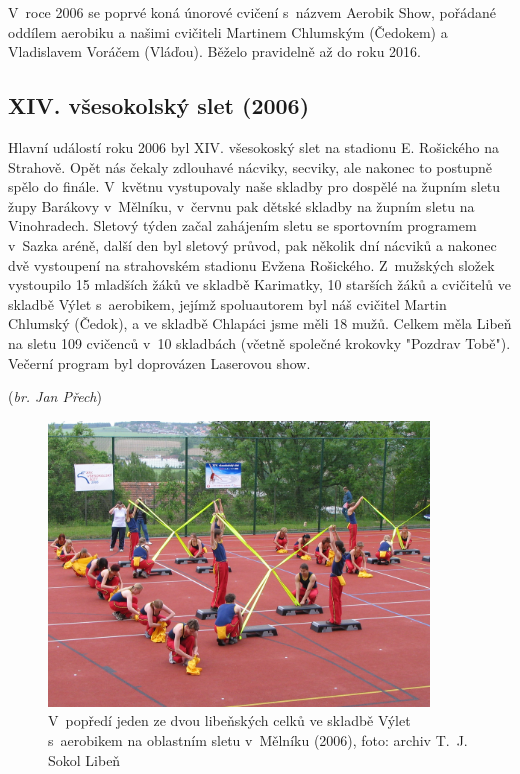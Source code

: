 \documentclass[a5paper, 11pt, twoside]{article}
\begin{document}
V~roce 2006 se poprvé koná únorové cvičení s~názvem Aerobik Show,
pořádané oddílem aerobiku a našimi cvičiteli Martinem Chlumským
(Čedokem) a Vladislavem Voráčem (Vláďou). Běželo pravidelně až do roku
2016.

\subsection{XIV. všesokolský slet (2006)}

Hlavní událostí roku 2006 byl XIV. všesokoský slet na stadionu E.
Rošického na Strahově. Opět nás čekaly zdlouhavé nácviky, secviky, ale
nakonec to postupně spělo do finále. V~květnu vystupovaly naše skladby
pro dospělé na župním sletu župy Barákovy v~Mělníku, v~červnu pak dětské
skladby na župním sletu na Vinohradech. Sletový týden začal zahájením
sletu se sportovním programem v~Sazka aréně, další den byl sletový
průvod, pak několik dní nácviků a nakonec dvě vystoupení na strahovském
stadionu Evžena Rošického. Z~mužských složek vystoupilo 15 mladších žáků
ve skladbě Karimatky, 10 starších žáků a cvičitelů ve skladbě Výlet
s~aerobikem, jejímž spoluautorem byl náš cvičitel Martin Chlumský (Čedok),
a ve skladbě Chlapáci jsme měli 18 mužů. Celkem měla Libeň na sletu 109
cvičenců v~10 skladbách (včetně společné krokovky "Pozdrav Tobě").
Večerní program byl doprovázen Laserovou show.

\hfill(\textit{br. Jan Přech})

\bigskip

\begin{figure}[h]
  \centering 
  \includegraphics[width=0.9\textwidth]{img/52_vylet_s_aerobikem.jpg}
  \caption*{V~popředí jeden ze dvou libeňských celků ve skladbě Výlet
  s~aerobikem na oblastním sletu v~Mělníku (2006), foto: archiv T.~J. Sokol
  Libeň}
\end{figure}
\end{document}
